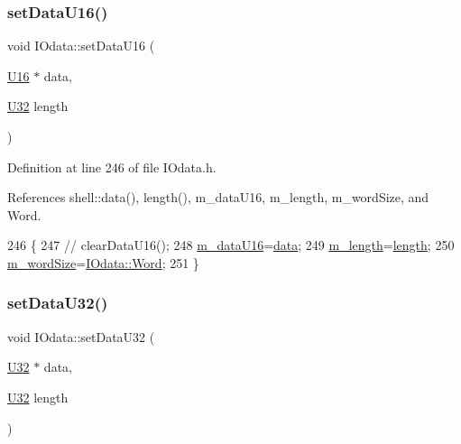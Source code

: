 \subsubsection{\texorpdfstring{set\+Data\+U16()}{setDataU16()}}
{\footnotesize\ttfamily void I\+Odata\+::set\+Data\+U16 (\begin{DoxyParamCaption}\item[{\hyperlink{classIOdata_a1eb45b348534a7c19a4a99b746e693ff}{U16} $\ast$}]{data,  }\item[{\hyperlink{classIOdata_a96fb57f5fcd87b708743abd3c86a5198}{U32}}]{length }\end{DoxyParamCaption})\hspace{0.3cm}{\ttfamily [inline]}}



Definition at line 246 of file I\+Odata.\+h.



References shell\+::data(), length(), m\+\_\+data\+U16, m\+\_\+length, m\+\_\+word\+Size, and Word.


\begin{DoxyCode}
246                                         \{
247 \textcolor{comment}{//    clearDataU16();}
248     \hyperlink{classIOdata_a8d698e077b7898009691b9086a3e6453}{m\_dataU16}=\hyperlink{namespaceshell_a5ea2525995cedc3efd69ea8a7f034d1e}{data};
249     \hyperlink{classIOdata_afabe57441da019eb614d277799106aac}{m\_length}=\hyperlink{classIOdata_abb40e71ce0290832a24857b4a1e7b1a3}{length};
250     \hyperlink{classIOdata_a719b0ce607ada4fa91b12d6ecfa1b4c9}{m\_wordSize}=\hyperlink{classIOdata_a37c53ebf4bf8d866aac8af572962a84ca7d603e9c9a55e3c8dffa4bd8e3dca491}{IOdata::Word};
251   \}
\end{DoxyCode}
\mbox{\label{classIOdata_a408b62ac645630c645ae670691f6459f}} 
\subsubsection{\texorpdfstring{set\+Data\+U32()}{setDataU32()}}
{\footnotesize\ttfamily void I\+Odata\+::set\+Data\+U32 (\begin{DoxyParamCaption}\item[{\hyperlink{classIOdata_a96fb57f5fcd87b708743abd3c86a5198}{U32} $\ast$}]{data,  }\item[{\hyperlink{classIOdata_a96fb57f5fcd87b708743abd3c86a5198}{U32}}]{length }\end{DoxyParamCaption})\hspace{0.3cm}{\ttfamily [inline]}}



